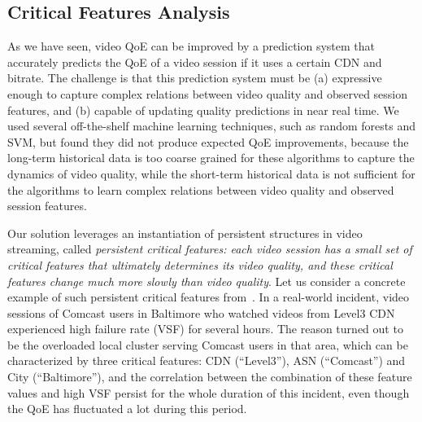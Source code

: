 
\subsection{Critical Features Analysis}
\label{subsec:overview:cfa}

As we have seen, video QoE can be improved by
a prediction system that accurately predicts the QoE 
of a video session if it uses a certain CDN and bitrate.
The challenge is that this prediction system must be 
(a) expressive enough to capture complex relations 
between video quality and observed session features, 
and (b) capable of updating quality predictions in near 
real time.
We used several off-the-shelf machine learning 
techniques, such as random forests and SVM, but 
found they did not produce expected QoE improvements, 
because the long-term historical data is too coarse grained 
for these algorithms to capture the dynamics of video 
quality, while the short-term historical data is not sufficient 
for the algorithms to learn complex relations between 
video quality and observed session features.

Our solution leverages an instantiation of persistent structures
in video streaming, called 
{\em persistent critical features: each video session has 
a small set of critical features that ultimately determines 
its video quality, and these critical features change much 
more slowly than video quality}. 
Let us consider a concrete example of such persistent 
critical features from~\cite{cfa}.
In a real-world incident, video sessions of Comcast
users in Baltimore who watched videos from Level3
CDN experienced high failure rate (VSF) for several
hours. The reason turned out
to be the overloaded local cluster serving Comcast
users in that area,
which can be characterized by three critical features: 
CDN (``Level3''), ASN (``Comcast'') and City (``Baltimore''),
and the correlation between the combination of these
feature values and high VSF persist for the whole
duration of this incident, even though the QoE
has fluctuated a lot during this period.

